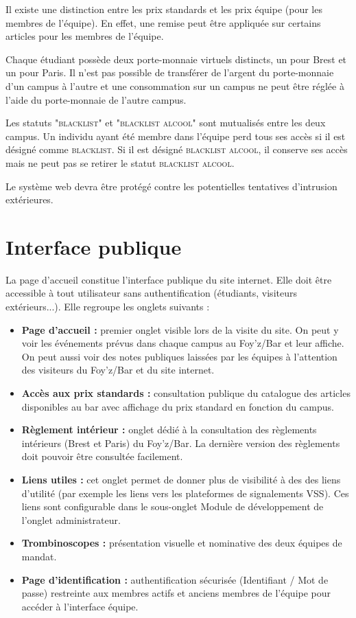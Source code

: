 \documentclass[a4paper,11pt]{article}
\begin{document}
Il existe une distinction entre les prix standards et les prix équipe (pour les membres de l'équipe). En effet, une remise peut être appliquée sur certains articles pour les membres de l'équipe.

Chaque étudiant possède deux porte-monnaie virtuels distincts, un pour Brest et un pour Paris. Il n'est pas possible de transférer de l'argent du porte-monnaie d'un campus à l'autre et une consommation sur un campus ne peut être réglée à l'aide du porte-monnaie de l'autre campus.

Les statuts \textsc{"blacklist"} et \textsc{"blacklist alcool"} sont mutualisés entre les deux campus. Un individu ayant été membre dans l'équipe perd tous ses accès si il est désigné comme \textsc{blacklist}. Si il est désigné \textsc{blacklist alcool}, il conserve ses accès mais ne peut pas se retirer le statut \textsc{blacklist alcool}.

Le système web devra être protégé contre les potentielles tentatives d'intrusion extérieures.

\section{Interface publique}
La page d'accueil constitue l'interface publique du site internet. Elle doit être accessible à tout utilisateur sans authentification (étudiants, visiteurs extérieurs...). Elle regroupe les onglets suivants :

\begin{itemize}
    \item \textbf{Page d'accueil :} premier onglet visible lors de la visite du site. On peut y voir les événements prévus dans chaque campus au Foy'z/Bar et leur affiche. On peut aussi voir des notes publiques laissées par les équipes à l'attention des visiteurs du Foy'z/Bar et du site internet.
    \item \textbf{Accès aux prix standards :} consultation publique du catalogue des articles disponibles au bar avec affichage du prix standard en fonction du campus.
    \item \textbf{Règlement intérieur :} onglet dédié à la consultation des règlements intérieurs (Brest et Paris) du Foy'z/Bar. La dernière version des règlements doit pouvoir être consultée facilement.
    \item \textbf{Liens utiles :} cet onglet permet de donner plus de visibilité à des des liens d'utilité (par exemple les liens vers les plateformes de signalements VSS). Ces liens sont configurable dans le sous-onglet Module de développement de l'onglet administrateur.
    \item \textbf{Trombinoscopes :} présentation visuelle et nominative des deux équipes de mandat.
    \item \textbf{Page d'identification :} authentification sécurisée (Identifiant / Mot de passe) restreinte aux membres actifs et anciens membres de l'équipe pour accéder à l'interface équipe.
\end{itemize}
\end{document}
